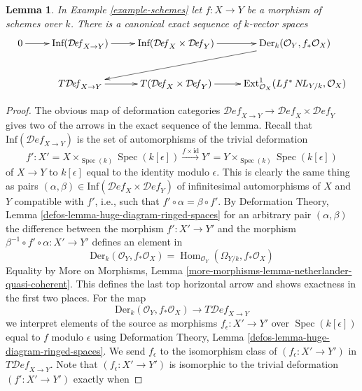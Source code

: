 \documentclass[10pt,a4paper]{amsart}
\theoremstyle{plain}
\newtheorem{lemma}[subsection]{Lemma}
\theoremstyle{definition}
\theoremstyle{remark}
\numberwithin{equation}{subsection}
\def\Spec{\mathop{\mathrm{Spec}}}
\def\Hom{\mathop{\mathrm{Hom}}\nolimits}
\def\NL{\mathop{N\!L}\nolimits}
\def\Deformationcategory{\mathcal{D}\!\mathit{ef}}
\begin{document}
\begin{lemma}
\label{lemma-schemes-morphisms-TI}
In Example \ref{example-schemes} let $f : X \to Y$ be a morphism of schemes
over $k$. There is a canonical exact sequence of $k$-vector spaces
$$
\xymatrix{
0 \ar[r] &
\text{Inf}(\Deformationcategory_{X \to Y}) \ar[r] &
\text{Inf}(\Deformationcategory_X \times \Deformationcategory_Y) \ar[r] &
\text{Der}_k(\mathcal{O}_Y, f_*\mathcal{O}_X) \ar[lld] \\
& T\Deformationcategory_{X \to Y} \ar[r] &
T(\Deformationcategory_X \times \Deformationcategory_Y) \ar[r] &
\text{Ext}^1_{\mathcal{O}_X}(Lf^*\NL_{Y/k}, \mathcal{O}_X)
}
$$
\end{lemma}

\begin{proof}
The obvious map of deformation categories
$\Deformationcategory_{X \to Y} \to
\Deformationcategory_X \times \Deformationcategory_Y$
gives two of the arrows in the exact sequence of the lemma.
Recall that $\text{Inf}(\Deformationcategory_{X \to Y})$
is the set of automorphisms of the trivial deformation
$$
f' :  X' = X \times_{\Spec(k)} \Spec(k[\epsilon])
\xrightarrow{f \times \text{id}}
Y' = Y \times_{\Spec(k)} \Spec(k[\epsilon])
$$
of $X \to Y$ to $k[\epsilon]$ equal to the identity modulo $\epsilon$.
This is clearly the same thing as pairs
$(\alpha, \beta) \in
\text{Inf}(\Deformationcategory_X \times \Deformationcategory_Y)$
of infinitesimal automorphisms of $X$ and $Y$ compatible with $f'$, i.e.,
such that $f' \circ \alpha = \beta \circ f'$.
By Deformation Theory, Lemma \ref{defos-lemma-huge-diagram-ringed-spaces}
for an arbitrary pair $(\alpha, \beta)$ the difference between
the morphism $f' : X' \to Y'$ and the morphism
$\beta^{-1} \circ f' \circ \alpha : X' \to Y'$ defines an element
in
$$
\text{Der}_k(\mathcal{O}_Y, f_*\mathcal{O}_X) =
\Hom_{\mathcal{O}_Y}(\Omega_{Y/k}, f_*\mathcal{O}_X)
$$
Equality by More on Morphisms, Lemma
\ref{more-morphisms-lemma-netherlander-quasi-coherent}.
This defines the last top horizontal arrow and shows exactness
in the first two places. For the map
$$
\text{Der}_k(\mathcal{O}_Y, f_*\mathcal{O}_X)
\to
T\Deformationcategory_{X \to Y}
$$
we interpret elements of the source as morphisms
$f_\epsilon : X' \to Y'$ over $\Spec(k[\epsilon])$
equal to $f$ modulo $\epsilon$
using Deformation Theory, Lemma \ref{defos-lemma-huge-diagram-ringed-spaces}.
We send $f_\epsilon$ to the isomorphism class of
$(f_\epsilon : X' \to Y')$ in $T\Deformationcategory_{X \to Y}$.
Note that $(f_\epsilon : X' \to Y')$ is isomorphic to the
trivial deformation $(f' : X' \to Y')$ exactly when

\end{proof}
\end{document}
